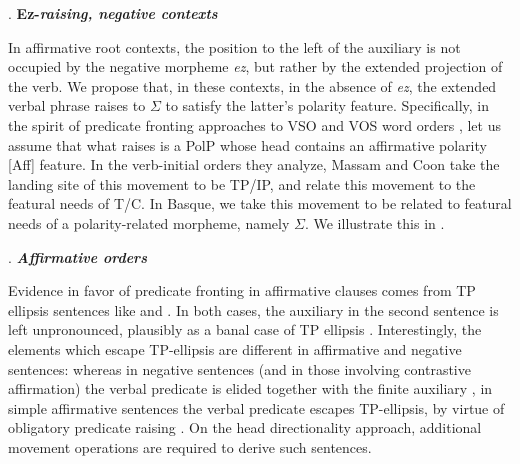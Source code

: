 \documentclass[output=paper]{langscibook}
\begin{document}
\ex. \textbf{Ez-\textit{raising, negative contexts}} \protect\label{tree-5} \\  \samepage
{}



	In affirmative root contexts, the position to the left of the auxiliary is not occupied by the negative morpheme \textit{ez}, but rather by the extended projection of the verb.  We propose that, in these contexts, in the absence of \textit{ez}, the extended verbal phrase raises to \begin{math}\Sigma \end{math} to satisfy the latter's polarity feature.  Specifically, in the spirit of predicate fronting approaches to VSO and VOS word orders  \citep{massam2000, massam2001, massam2010, coon2010, coon2012}, let us assume that what raises is a PolP whose head contains an affirmative polarity [Aff] feature.  In the verb-initial orders they analyze, Massam and Coon take the landing site of this movement to be TP/IP, and relate this movement to the featural needs of T/C.  In Basque, we take this movement to be related to featural needs of a polarity-related morpheme, namely  \begin{math}\Sigma \end{math}. We illustrate this in \Next.\protect\footnotemark \protect{}
	

\ex. \textbf{\textit{Affirmative orders}} \protect\label{tree-6} \\ \samepage
{}




Evidence in favor of predicate fronting in affirmative clauses comes from TP ellipsis sentences like \Next and \NNext. In both cases, the auxiliary in the second sentence is left unpronounced, plausibly as a banal case of TP ellipsis \citep{laka1990}.  Interestingly, the elements which escape TP-ellipsis are different in affirmative and negative sentences: whereas in negative sentences (and in those involving contrastive affirmation) the verbal predicate is elided together with the finite auxiliary \NNext, in simple affirmative sentences the verbal predicate escapes TP-ellipsis, by virtue of obligatory predicate raising \Next. On the head directionality approach, additional movement operations are required to derive such sentences.
\end{document}
